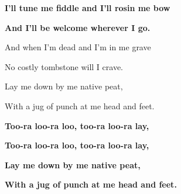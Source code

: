 \textbf{I'll tune me fiddle and I'll rosin me bow}

\textbf{And I'll be welcome wherever I go.}

\bigskip

And when I'm dead and I'm in me grave

No costly tombstone will I crave.

Lay me down by me native peat,

With a jug of punch at me head and feet.

\textbf{Too-ra loo-ra loo, too-ra loo-ra lay,}

\textbf{Too-ra loo-ra loo, too-ra loo-ra lay,}

\textbf{Lay me down by me native peat,}

\textbf{With a jug of punch at me head and feet.}
